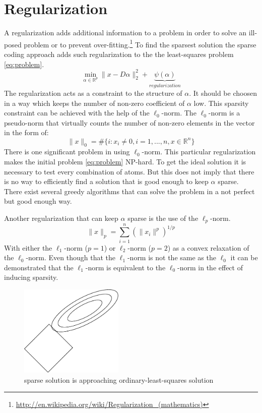 \section{Regularization}
A regularization adds additional information to a problem in order to solve an
ill-posed problem or to prevent over-fitting.\footnote{\url{
http://en.wikipedia.org/wiki/Regularization_(mathematics)}}
To find the sparsest solution the sparse coding approach adds such
regularization to the the least-squares problem \ref{eq:problem}. 
\begin{equation}
\min_{\alpha\in\mathbb{R}^{p}} \lVert x - D\alpha \rVert^{2}_{2} +
\underbrace{\psi(\alpha)}_{regularization}
\end{equation}
The regularization acts as a constraint to the structure of $\alpha$. It should
be choosen in a way which keeps the number of non-zero coefficient of $\alpha$
low. This sparsity constraint can be achieved with the help of the
$\ell_0$-norm. The $\ell_0$-norm is a pseudo-norm that virtually counts the
number of non-zero elements in the vector in the form of:
\begin{equation}
\lVert x\rVert_{0} = \#\{i:x_i \neq 
0,i=1,...,n, x\in\mathbb{R}^n\} 
\end{equation}
There is one significant problem in using $\ell_0$-norm. This particular
regularization makes the initial problem \ref{eq:problem} NP-hard. To get the
ideal solution it is necessary to test every combination of atoms. But this
does not imply that there is no way to efficiently find a solution that is good
enough to keep $\alpha$ sparse. There exist several greedy algorithms that can
solve the problem in a not perfect but good enough way. 

Another regularization that can keep $\alpha$ sparse is the use of the
$\ell_p$-norm.
\begin{equation*}
\lVert x\rVert_p = \sum_{i=1}^n\left(\lVert x_i \lVert^p\right)^{1/p}
\end{equation*}
With either the $\ell_1$-norm ($p=1$) or $\ell_2$-norm ($p=2$) as a
convex relaxation of the $\ell_0$-norm. Even though that the $\ell_1$-norm is
not the same as the $\ell_0$ it can be demonstrated that the $\ell_1$-norm is
equivalent to the $\ell_0$-norm in the effect of inducing sparsity.
\begin{figure}[h]
\centering
\includegraphics[width = 0.44\textwidth]{images/regularization.pdf}
\caption{sparse solution is approaching ordinary-least-squares solution}
\label{fig:sparse}
\end{figure}

